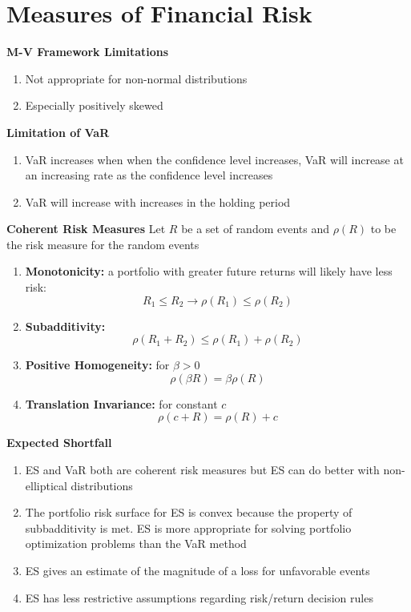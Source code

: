 \documentclass[11pt,fleqn]{report} %
\numberwithin{equation}{section} %
\numberwithin{figure}{section} %
\numberwithin{table}{section} %
\begin{document}
\chapter{Measures of Financial Risk}
\begin{definition}\textbf{M-V Framework Limitations}
\begin{enumerate}
    \item Not appropriate for non-normal distributions
    \item Especially positively skewed
\end{enumerate}
\end{definition}
\begin{definition}\textbf{Limitation of VaR}
\begin{enumerate}
    \item VaR increases when when the confidence level increases, VaR will increase at an increasing rate as the confidence level increases
    \item VaR will increase with increases in the holding period
\end{enumerate}
\end{definition}
\begin{definition}
\textbf{Coherent Risk Measures}
Let $R$ be a set of random events and $\rho(R)$ to be the risk measure for the random events
\begin{enumerate}
    \item \textbf{Monotonicity:} a portfolio with greater future returns will likely have less risk:
    $$
    R_1\leq R_2\to\rho(R_1)\leq\rho(R_2)
    $$
    \item \textbf{Subadditivity:}
    $$
    \rho(R_1+R_2)\leq \rho(R_1)+\rho(R_2)
    $$
    \item \textbf{Positive Homogeneity:} for $\beta>0$
    $$
    \rho(\beta R)=\beta\rho(R)
    $$
    \item \textbf{Translation Invariance:} for constant $c$
    $$
    \rho(c+R)=\rho(R)+c
    $$
\end{enumerate}
\end{definition}
\begin{definition}\textbf{Expected Shortfall}\\
\begin{enumerate}
    \item ES and VaR both are coherent risk measures but ES can do better with non-elliptical distributions
    \item The portfolio risk surface for ES is convex because the property of subbadditivity is met. ES is more appropriate for solving portfolio optimization problems than the VaR method
    \item ES gives an estimate of the magnitude of a loss for unfavorable events
    \item ES has less restrictive assumptions regarding risk/return decision rules
\end{enumerate}


\end{definition}
\end{document}
